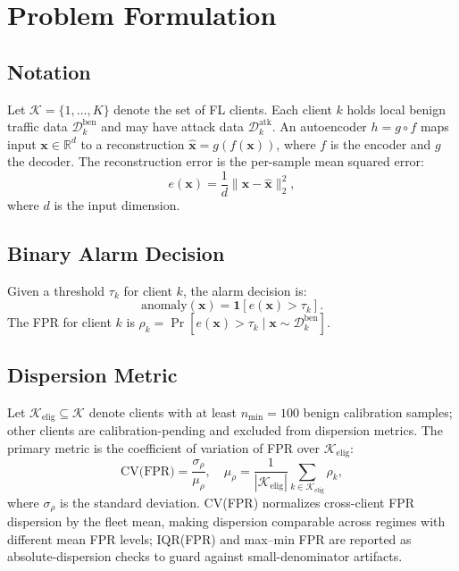 \section{Problem Formulation}
\label{sec:formulation}

\subsection{Notation}
Let $\mathcal{K}=\{1,\dots,K\}$ denote the set of FL clients.
Each client $k$ holds local benign traffic data $\mathcal{D}_k^{\text{ben}}$ and may have
attack data $\mathcal{D}_k^{\text{atk}}$.
An autoencoder $h = g \circ f$ maps input $\mathbf{x} \in \mathbb{R}^d$ to a reconstruction
$\hat{\mathbf{x}} = g(f(\mathbf{x}))$, where $f$ is the encoder and $g$ the decoder.
The reconstruction error is the per-sample mean squared error:
\begin{equation}
  e(\mathbf{x}) = \frac{1}{d}\|\mathbf{x} - \hat{\mathbf{x}}\|_2^2,
\end{equation}
where $d$ is the input dimension.

\subsection{Binary Alarm Decision}
Given a threshold $\tau_k$ for client $k$, the alarm decision is:
\begin{equation}
  \text{anomaly}(\mathbf{x}) = \mathbf{1}[e(\mathbf{x}) > \tau_k].
\end{equation}
The FPR for client $k$ is $\rho_k = \Pr[e(\mathbf{x}) > \tau_k \mid \mathbf{x} \sim \mathcal{D}_k^{\text{ben}}]$.

\subsection{Dispersion Metric}
Let $\mathcal{K}_{\mathrm{elig}}\subseteq\mathcal{K}$ denote clients with at least $n_{\min}=100$ benign calibration samples; other clients are calibration-pending and excluded from dispersion metrics. The primary metric is the coefficient of variation of FPR over $\mathcal{K}_{\mathrm{elig}}$:
\begin{equation}
  \text{CV(FPR)} = \frac{\sigma_{\rho}}{\mu_{\rho}},\quad
  \mu_{\rho} = \frac{1}{|\mathcal{K}_{\mathrm{elig}}|}\sum_{k\in\mathcal{K}_{\mathrm{elig}}} \rho_k,
\end{equation}
where $\sigma_{\rho}$ is the standard deviation.
CV(FPR) normalizes cross-client FPR dispersion by the fleet mean, making dispersion
comparable across regimes with different mean FPR levels; IQR(FPR) and
max--min FPR are reported as absolute-dispersion checks to guard against small-denominator artifacts.

